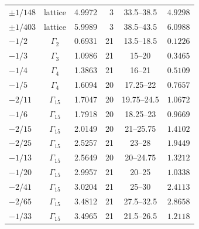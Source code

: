 \documentclass[11pt]{amsart}
\theoremstyle{definition}
\theoremstyle{remark}
\numberwithin{equation}{section}
\begin{document}
\begin{center}
\begin{longtable}{@{}lcrrcr@{}}
$\pm1/148$ & lattice & 4.9972 & 3 & 33.5--38.5 & $4.9298$ \\
$\pm1/403$ & lattice & 5.9989 & 3 & 38.5--43.5 & $6.0988$ \\
$-1/2$ & $\Gamma_2$ & 0.6931 & 21 & 13.5--18.5 & $0.1226$ \\
$-1/3$ & $\Gamma_3$ & 1.0986 & 21 & 15--20 & $0.3465$ \\
$-1/4$ & $\Gamma_4$ & 1.3863 & 21 & 16--21 & $0.5109$ \\
$-1/5$ & $\Gamma_4$ & 1.6094 & 20 & 17.25--22 & $0.7657$ \\
$-2/11$ & $\Gamma_{15}$ & 1.7047 & 20 & 19.75--24.5 & $1.0672$ \\
$-1/6$ & $\Gamma_{15}$ & 1.7918 & 20 & 18.25--23 & $0.9669$ \\
$-2/15$ & $\Gamma_{15}$ & 2.0149 & 20 & 21--25.75 & $1.4102$ \\
$-2/25$ & $\Gamma_{15}$ & 2.5257 & 21 & 23--28 & $1.9449$ \\
$-1/13$ & $\Gamma_{15}$ & 2.5649 & 20 & 20--24.75 & $1.3212$ \\
$-1/20$ & $\Gamma_{15}$ & 2.9957 & 21 & 20--25 & $1.0338$ \\
$-2/41$ & $\Gamma_{15}$ & 3.0204 & 21 & 25--30 & $2.4113$ \\
$-2/65$ & $\Gamma_{15}$ & 3.4812 & 21 & 27.5--32.5 & $2.8658$ \\
$-1/33$ & $\Gamma_{15}$ & 3.4965 & 21 & 21.5--26.5 & $1.2118$ \\
\end{longtable}
\end{center}



\end{document}
